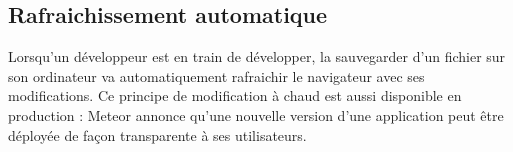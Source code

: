 \subsection{Rafraichissement automatique}

Lorsqu'un développeur est en train de développer, la sauvegarder d’un fichier sur son ordinateur va automatiquement rafraichir le navigateur avec ses modifications. Ce principe de modification à chaud est aussi disponible en production : Meteor annonce qu’une nouvelle version d'une application peut être déployée de façon transparente à ses utilisateurs.

